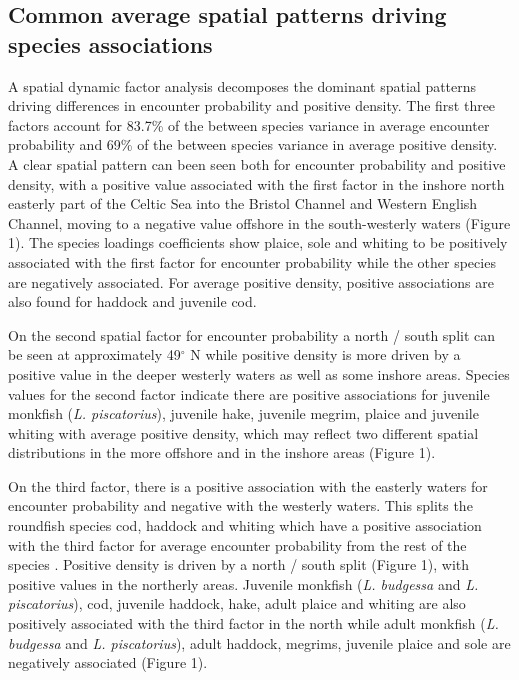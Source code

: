 \documentclass{nature}
\begin{document}
\begin{linenumbers}
\subsection{Common average spatial patterns driving species associations} A
spatial dynamic factor analysis decomposes the dominant spatial patterns
driving differences in encounter probability and positive density. The first
three factors  account for 83.7\% of the between
species variance in average encounter probability and 69\% of the between
species variance in average positive density. A clear spatial pattern can been
seen both for encounter probability and positive density, with a positive value
associated with the first factor in the inshore north easterly part of the
Celtic Sea into the Bristol Channel and Western English Channel, moving to a
negative value offshore in the south-westerly waters (Figure 1).  The species
loadings coefficients show plaice, sole and whiting to be positively associated
with the first factor for encounter probability while the other species are
negatively associated. For average positive density, positive associations are
also found for haddock and juvenile cod.  

On the second spatial factor for encounter probability a north / south split
can be seen at approximately 49$^{\circ}$ N while positive density is more
driven by a positive value in the deeper westerly waters as well as some
inshore areas. Species values for the second factor indicate there are positive
associations for juvenile monkfish (\emph{L. piscatorius}), juvenile hake,
juvenile megrim, plaice and juvenile whiting with average positive density,
which may reflect two different spatial distributions in the more offshore and
in the inshore areas (Figure 1).

On the third factor, there is a positive association with the easterly waters
for encounter probability and negative with the westerly waters. This
 splits the
roundfish species cod, haddock and whiting which  have a positive
association with the third factor for average encounter probability from the
rest of the species .  Positive
density is driven by a north / south split (Figure 1), with positive values in
the northerly areas. Juvenile monkfish (\emph{L.  budgessa} and \emph{L.
	piscatorius}), cod, juvenile haddock, hake, adult plaice and whiting
are also positively associated with the third factor in the north while adult
monkfish (\emph{L. budgessa} and \emph{L.  piscatorius}), adult haddock,
megrims, juvenile plaice and sole are negatively associated  (Figure 1).


\end{linenumbers}
\end{document}
